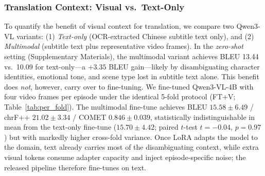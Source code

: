 \documentclass[mathematics,article,submit,xetex,moreauthors]{Definitions/mdpi}
\begin{document}
\subsubsection{Translation Context: Visual vs.\ Text-Only}
\label{sec:ablation_context}
To quantify the benefit of visual context for translation, we compare two Qwen3-VL variants: (1) \textit{Text-only} (OCR-extracted Chinese subtitle text only), and (2) \textit{Multimodal} (subtitle text plus representative video frames).
In the \emph{zero-shot} setting (Supplementary Materials), the multimodal variant achieves BLEU 13.44 vs.\ 10.09 for text-only---a $+3.35$ BLEU gain---likely by disambiguating character identities, emotional tone, and scene type lost in subtitle text alone.
This benefit does \emph{not}, however, carry over to fine-tuning.
We fine-tuned Qwen3-VL-4B with four video frames per episode under the identical 5-fold protocol (FT+V; Table~\ref{tab:per_fold}).
The multimodal fine-tune achieves BLEU $15.58\pm6.49$ / chrF++ $21.02\pm3.34$ / COMET $0.846\pm0.039$, statistically indistinguishable in mean from the text-only fine-tune ($15.70\pm4.42$; paired $t$-test $t=-0.04$, $p=0.97$) but with markedly higher cross-fold variance.
Once LoRA adapts the model to the domain, text already carries most of the disambiguating context, while extra visual tokens consume adapter capacity and inject episode-specific noise; the released pipeline therefore fine-tunes on text.
\end{document}
